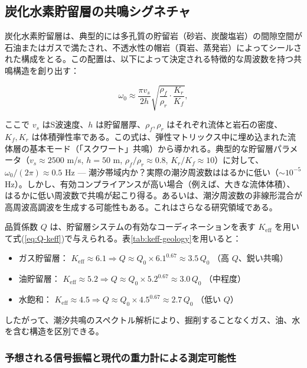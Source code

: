 \documentclass[12pt,a4paper]{article}
\theoremstyle{remark}
\newcommand{\Keff}{K_{\mathrm{eff}}}
\begin{document}
	\subsection{炭化水素貯留層の共鳴シグネチャ}
	
	炭化水素貯留層は、典型的には多孔質の貯留岩（砂岩、炭酸塩岩）の間隙空間が石油またはガスで満たされ、不透水性の帽岩（頁岩、蒸発岩）によってシールされた構成をとる。この配置は、以下によって決定される特徴的な周波数を持つ共鳴構造を創り出す：
	
	\begin{equation}
		\omega_0 \approx \frac{\pi v_s}{2h} \sqrt{\frac{\rho_f}{\rho_r} \cdot \frac{K_r}{K_f}},
		\label{eq:resonant-frequency}
	\end{equation}
	
	ここで \(v_s\) はS波速度、\(h\) は貯留層厚、\(\rho_f, \rho_r\) はそれぞれ流体と岩石の密度、\(K_f, K_r\) は体積弾性率である。この式は、弾性マトリックス中に埋め込まれた流体層の基本モード（「スクワート」共鳴）から導かれる。典型的な貯留層パラメータ（\(v_s \approx 2500\) m/s, \(h = 50\) m, \(\rho_f/\rho_r \approx 0.8\), \(K_r/K_f \approx 10\)）に対して、\(\omega_0/(2\pi) \approx 0.5\) Hz — 潮汐帯域内か？実際の潮汐周波数ははるかに低い（\(\sim 10^{-5}\) Hz）。しかし、有効コンプライアンスが高い場合（例えば、大きな流体体積）、はるかに低い周波数で共鳴が起こり得る。あるいは、潮汐周波数の非線形混合が高周波高調波を生成する可能性もある。これはさらなる研究領域である。
	
	品質係数 \(Q\) は、貯留層システムの有効なコーディネーションを表す \(\Keff\) を用いて式(\ref{eq:Q-keff})で与えられる。表\ref{tab:keff-geology}を用いると：
	
	\begin{itemize}
		\item ガス貯留層： \(\Keff \approx 6.1 \Rightarrow Q \approx Q_0 \times 6.1^{0.67} \approx 3.5\,Q_0\) （高 \(Q\)、鋭い共鳴）
		\item 油貯留層： \(\Keff \approx 5.2 \Rightarrow Q \approx Q_0 \times 5.2^{0.67} \approx 3.0\,Q_0\) （中程度）
		\item 水飽和： \(\Keff \approx 4.5 \Rightarrow Q \approx Q_0 \times 4.5^{0.67} \approx 2.7\,Q_0\) （低い \(Q\)）
	\end{itemize}
	
	したがって、潮汐共鳴のスペクトル解析により、掘削することなくガス、油、水を含む構造を区別できる。
	
	\subsubsection{予想される信号振幅と現代の重力計による測定可能性}
	\label{subsubsec:signal_amplitude}
	
\end{document}

